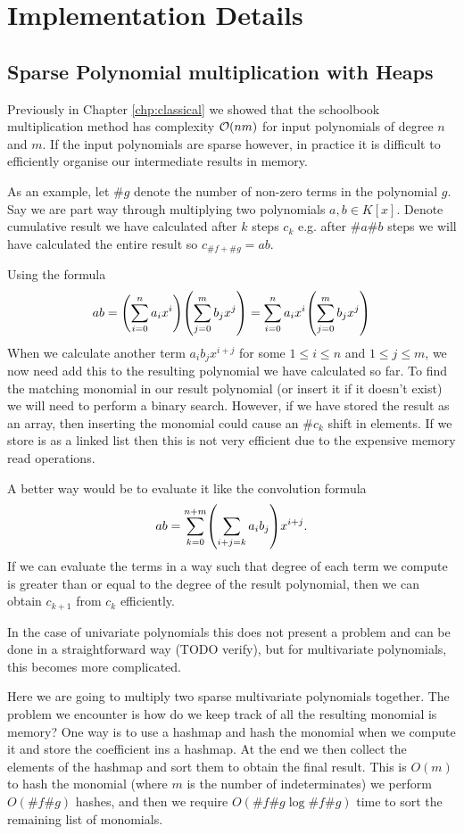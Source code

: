 \chapter{Implementation Details}\label{chp:implementation}

\section{Sparse Polynomial multiplication with Heaps}

Previously in Chapter \ref{chp:classical} we showed that the schoolbook multiplication method has complexity $\mathcal O(nm)$ for input polynomials of degree $n$ and $m$. If the input polynomials are sparse however, in practice it is difficult to efficiently organise our intermediate results in memory.

As an example, let $\# g$ denote the number of non-zero terms in the polynomial $g$. Say we are part way through multiplying two polynomials $a, b \in K[x]$. Denote cumulative result we have calculated after $k$ steps $c_k$ e.g. after $\# a \# b$ steps we will have calculated the entire result so $c_{\#f + \#g} = ab$.

Using the formula
\[
    ab = \bb{\sum^n_{i=0} a_i x^i}\bb{\sum^m_{j=0} b_j x^j} = \sum^n_{i=0} a_ix^i\bb{\sum^m_{j=0} b_j x^j}
\]
When we calculate another term $a_ib_j x^{i + j}$ for some $1 \le i \le n$ and $1 \le j \le m$, we now need add this to the resulting polynomial we have calculated so far. To find the matching monomial in our result polynomial (or insert it if it doesn't exist) we will need to perform a binary search. However, if we have stored the result as an array, then inserting the monomial could cause an $\#c_k$ shift in elements. If we store is as a linked list then this is not very efficient due to the expensive memory read operations.

A better way would be to evaluate it like the convolution formula 
\[
    ab = \sum^{n + m}_{k=0} \bb{\sum_{i + j = k}a_ib_j} x^{i + j}.
\]
If we can evaluate the terms in a way such that degree of each term we compute is greater than or equal to the degree of the result polynomial, then we can obtain $c_{k+1}$ from $c_k$ efficiently.

In the case of univariate polynomials this does not present a problem and can be done in a straightforward way (TODO verify), but for multivariate polynomials, this becomes more complicated.

Here we are going to multiply two sparse multivariate polynomials together. The problem we encounter is how do we keep track of all the resulting monomial is memory? One way is to use a hashmap and hash the monomial when we compute it and store the coefficient ins a hashmap. At the end we then collect the elements of the hashmap and sort them to obtain the final result. This is $O(m)$ to hash the monomial (where $m$ is the number of indeterminates) we perform $O(\# f \# g)$ hashes, and then we require $O(\#f \#g \log \# f \# g)$ time to sort the remaining list of monomials.

